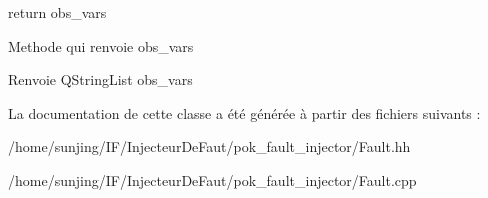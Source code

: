 return obs\_\-vars 

Methode qui renvoie obs\_\-vars

\begin{DoxyReturn}{Renvoie}
QStringList obs\_\-vars 
\end{DoxyReturn}


La documentation de cette classe a été générée à partir des fichiers suivants :\begin{DoxyCompactItemize}
\item 
/home/sunjing/IF/InjecteurDeFaut/pok\_\-fault\_\-injector/Fault.hh\item 
/home/sunjing/IF/InjecteurDeFaut/pok\_\-fault\_\-injector/Fault.cpp\end{DoxyCompactItemize}
